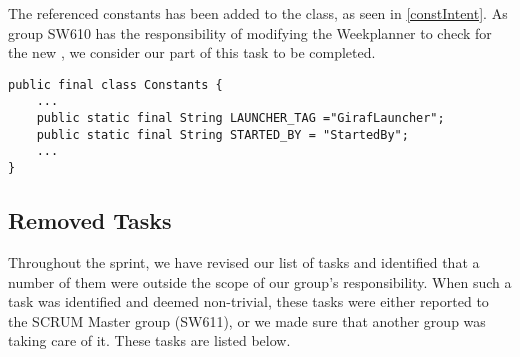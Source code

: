 The referenced constants has been added to the  class, as seen
in \autoref{constIntent}. As group SW610 has the responsibility of
modifying the Weekplanner to check for the new , we consider our
part of this task to be completed.\nl

\begin{minipage}[H]{\linewidth}
\begin{lstlisting}[caption = Constants containing the strings for the Launchers's \textc{Intent}., label = constIntent] 
public final class Constants {
	...
	public static final String LAUNCHER_TAG ="GirafLauncher";
	public static final String STARTED_BY = "StartedBy";
	...
}
\end{lstlisting}
\end{minipage}

\subsection{Removed Tasks}
Throughout the sprint, we have revised our list of tasks and identified
that a number of them were outside the scope of our group's responsibility.
When such a task was identified and deemed non-trivial, these tasks were either
reported to the SCRUM Master group (SW611), or we made sure that another group
was taking care of it. These tasks are listed below.

